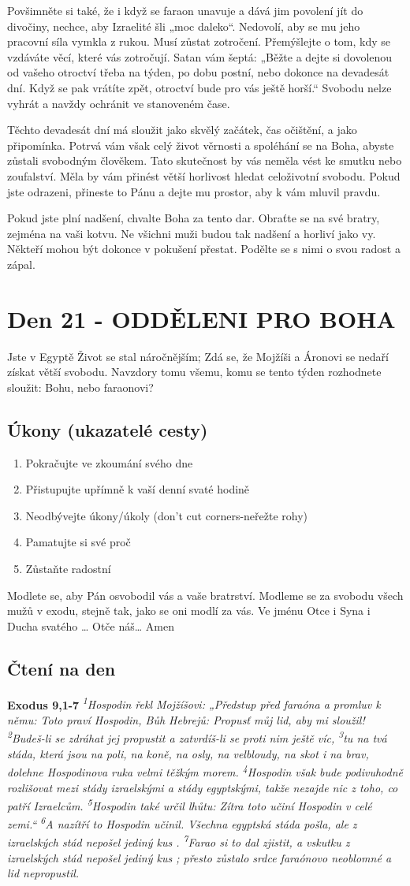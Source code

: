 \documentclass[11pt]{article}
\newcommand{\zacatekTretiTyden}{
  Jste v Egyptě \newline
  Život se stal náročnějším; Zdá se, že Mojžíši a Áronovi se nedaří získat větší svobodu. Navzdory tomu všemu,
komu se tento týden rozhodnete sloužit: Bohu, nebo faraonovi?

\subsection*{Úkony (ukazatelé cesty)}
\begin{enumerate}
  \item Pokračujte ve zkoumání svého dne
  \item Přistupujte upřímně k vaší denní svaté hodině
  \item Neodbývejte úkony/úkoly (don’t cut corners-neřežte rohy)
  \item Pamatujte si své proč
  \item Zůstaňte radostní
\end{enumerate}
Modlete se, aby Pán osvobodil vás a vaše bratrství. \newline
Modleme se za svobodu všech mužů v exodu, stejně tak, jako se oni modlí za vás.\newline
Ve jménu Otce i Syna i Ducha svatého …  Otče náš… Amen
}
\begin{document}
Povšimněte si také, že i když se faraon unavuje a dává jim povolení jít do divočiny, nechce, aby Izraelité
šli „moc daleko“. Nedovolí, aby se mu jeho pracovní síla vymkla z rukou. Musí zůstat zotročení.
Přemýšlejte o tom, kdy se vzdáváte věcí, které vás zotročují. Satan vám šeptá: „Běžte a dejte si dovolenou
od vašeho otroctví třeba na týden, po dobu postní, nebo dokonce na devadesát dní. Když se pak vrátíte
zpět, otroctví bude pro vás ještě horší.“ Svobodu nelze vyhrát a navždy ochránit ve stanoveném čase.

Těchto devadesát dní má sloužit jako skvělý začátek, čas očištění, a jako připomínka. Potrvá vám však
celý život věrnosti a spoléhání se na Boha, abyste zůstali svobodným člověkem.
Tato skutečnost by vás neměla vést ke smutku nebo zoufalství. Měla by vám přinést větší horlivost hledat
celoživotní svobodu. Pokud jste odrazeni, přineste to Pánu a dejte mu prostor, aby k vám mluvil pravdu.

Pokud jste plní nadšení, chvalte Boha za tento dar. Obraťte se na své bratry, zejména na vaši kotvu. Ne
všichni muži budou tak nadšení a horliví jako vy. Někteří mohou být dokonce v pokušení přestat. Podělte
se s nimi o svou radost a zápal.

\newpage
\section{Den 21 - ODDĚLENI PRO BOHA}
\zacatekTretiTyden
\subsection*{Čtení na den}
\textbf{Exodus 9,1-7}
\newline
\textit{
\textsuperscript{1}Hospodin řekl Mojžíšovi: „Předstup před faraóna a promluv k němu: Toto praví Hospodin, Bůh Hebrejů: Propusť můj lid, aby mi sloužil!
\textsuperscript{2}Budeš-li se zdráhat jej propustit a zatvrdíš-li se proti nim ještě víc,
\textsuperscript{3}tu na tvá stáda, která jsou na poli, na koně, na osly, na velbloudy, na skot i na brav, dolehne Hospodinova ruka velmi těžkým morem.
\textsuperscript{4}Hospodin však bude podivuhodně rozlišovat mezi stády izraelskými a stády egyptskými, takže nezajde nic z toho, co patří Izraelcům.
\textsuperscript{5}Hospodin také určil lhůtu: Zítra toto učiní Hospodin v celé zemi.“
\textsuperscript{6}A nazítří to Hospodin učinil. Všechna egyptská stáda pošla, ale z izraelských stád nepošel jediný kus .
\textsuperscript{7}Farao si to dal zjistit, a vskutku z izraelských stád nepošel jediný kus ; přesto zůstalo srdce faraónovo neoblomné a lid nepropustil.
}
\end{document}
